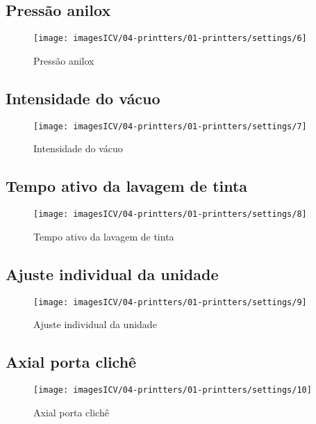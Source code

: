 \subsection{Pressão anilox}
\begin{figure}
    \centering
    \texttt{[image: imagesICV/04-printters/01-printters/settings/6]}
    \caption{Pressão anilox}
\end{figure}
\newpage
\thispagestyle{fancy}
\vspace{\fill}

\subsection{Intensidade do vácuo}
\begin{figure}
    \centering
    \texttt{[image: imagesICV/04-printters/01-printters/settings/7]}
    \caption{Intensidade do vácuo}
\end{figure}
\newpage
\thispagestyle{fancy}
\vspace{\fill}

\subsection{Tempo ativo da lavagem de tinta}
\begin{figure}
    \centering
    \texttt{[image: imagesICV/04-printters/01-printters/settings/8]}
    \caption{Tempo ativo da lavagem de tinta}
\end{figure}
\newpage
\thispagestyle{fancy}
\vspace{\fill}

\subsection{Ajuste individual da unidade}
\begin{figure}
    \centering
    \texttt{[image: imagesICV/04-printters/01-printters/settings/9]}
    \caption{Ajuste individual da unidade}
\end{figure}
\newpage
\thispagestyle{fancy}
\vspace{\fill}

\subsection{Axial porta clichê}
\begin{figure}
    \centering
    \texttt{[image: imagesICV/04-printters/01-printters/settings/10]}
    \caption{Axial porta clichê}
\end{figure}
\newpage
\thispagestyle{fancy}
\vspace{\fill}

